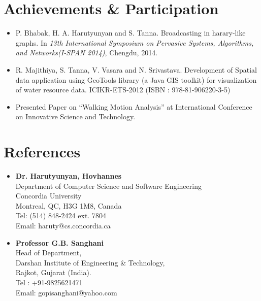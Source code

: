 \documentclass[12pt,a4paper,sans]{moderncv} %
\begin{document}
\section{Achievements \& Participation}
\begin{itemize}
\item P. Bhabak, H. A. Harutyunyan and S. Tanna. Broadcasting in harary-like graphs. In \textit{13th International Symposium on Pervasive Systems, Algorithms, and Networks(I-SPAN 2014)}, Chengdu, 2014. \\
\item 	R. Majithiya, S. Tanna, V. Vasara and N. Srivastava. Development of Spatial data application using GeoTools library (a Java GIS toolkit) for visualization of water resource data. ICIKR-ETS-2012 (ISBN : 978-81-906220-3-5) \\
\item Presented Paper on ``Walking Motion Analysis'' at International Conference on Innovative Science and Technology.

\end{itemize}



\section{References}
\begin{itemize}
\item \textbf{Dr. Harutyunyan, Hovhannes}\\
Department of Computer Science and Software Engineering\\
Concordia University\\
Montreal, QC, H3G 1M8, Canada\\
Tel: (514) 848-2424 ext. 7804\\
Email: haruty@cs.concordia.ca\\
\item \textbf{Professor G.B. Sanghani}\\
Head of Department,\\
Darshan Institute of Engineering \& Technology,\\
Rajkot, Gujarat (India).\\
Tel : +91-9825621471\\
Email: gopisanghani@yahoo.com
\end{itemize}
\end{document}
